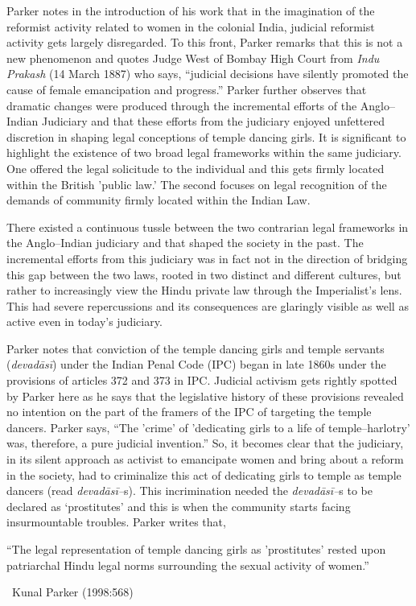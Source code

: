 Parker notes in the introduction of his work that in the imagination of the reformist activity related to women in the colonial India, judicial reformist activity gets largely disregarded. To this front, Parker remarks that this is not a new phenomenon and quotes Judge West of Bombay High Court from \textit{Indu Prakash} (14 March 1887) who says, “judicial decisions have silently promoted the cause of female emancipation and progress.” Parker further observes that dramatic changes were produced through the incremental efforts of the Anglo–Indian Judiciary and that these efforts from the judiciary enjoyed unfettered discretion in shaping legal conceptions of temple dancing girls. It is significant to highlight the existence of two broad legal frameworks within the same judiciary. One offered the legal solicitude to the individual and this gets firmly located within the British 'public law.’ The second focuses on legal recognition of the demands of community firmly located within the Indian Law.

There existed a continuous tussle between the two contrarian legal frameworks in the Anglo–Indian judiciary and that shaped the society in the past. The incremental efforts from this judiciary was in fact not in the direction of bridging this gap between the two laws, rooted in two distinct and different cultures, but rather to increasingly view the Hindu private law through the Imperialist’s lens. This had severe repercussions and its consequences are glaringly visible as well as active even in today’s judiciary.

Parker notes that conviction of the temple dancing girls and temple servants (\textit{devadāsī}) under the Indian Penal Code (IPC) began in late 1860s under the provisions of articles 372 and 373 in IPC. Judicial activism gets rightly spotted by Parker here as he says that the legislative history of these provisions revealed no intention on the part of the framers of the IPC of targeting the temple dancers. Parker says, “The 'crime' of 'dedicating girls to a life of temple–harlotry' was, therefore, a pure judicial invention.” So, it becomes clear that the judiciary, in its silent approach as activist to emancipate women and bring about a reform in the society, had to criminalize this act of dedicating girls to temple as temple dancers (read \textit{devadāsī–}s). This incrimination needed the \textit{devadāsī–}s to be declared as ‘prostitutes’ and this is when the community starts facing insurmountable troubles. Parker writes that,

\begin{myquote}
“The legal representation of temple dancing girls as 'prostitutes' rested upon patriarchal Hindu legal norms surrounding the sexual activity of women.” 

~\hfill Kunal Parker (1998:568)
\end{myquote}

